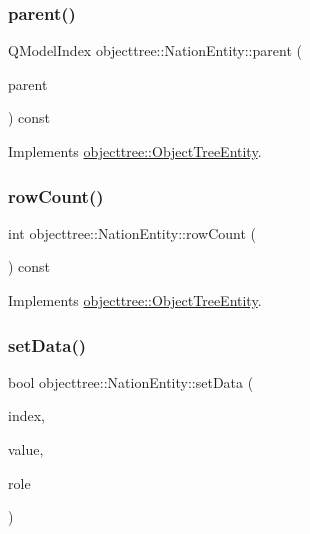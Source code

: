 \mbox{\label{classobjecttree_1_1_nation_entity_a8d234e253f9fee34e9914f211ca07345}} 
\subsubsection{\texorpdfstring{parent()}{parent()}}
{\footnotesize\ttfamily Q\+Model\+Index objecttree\+::\+Nation\+Entity\+::parent (\begin{DoxyParamCaption}\item[{const Q\+Model\+Index \&}]{parent }\end{DoxyParamCaption}) const\hspace{0.3cm}{\ttfamily [virtual]}}



Implements \mbox{\hyperlink{classobjecttree_1_1_object_tree_entity_a2d1b13c056476f87637aacd7e99e7305}{objecttree\+::\+Object\+Tree\+Entity}}.

\mbox{\label{classobjecttree_1_1_nation_entity_ad7eee2c49a533376829241e4477c8d9d}} 
\subsubsection{\texorpdfstring{rowCount()}{rowCount()}}
{\footnotesize\ttfamily int objecttree\+::\+Nation\+Entity\+::row\+Count (\begin{DoxyParamCaption}{ }\end{DoxyParamCaption}) const\hspace{0.3cm}{\ttfamily [virtual]}}



Implements \mbox{\hyperlink{classobjecttree_1_1_object_tree_entity_a82c626bb28c55dcfce11cf7ec3368588}{objecttree\+::\+Object\+Tree\+Entity}}.

\mbox{\label{classobjecttree_1_1_nation_entity_a0021c25f09f403b8d9b1f3366f08d7f8}} 
\subsubsection{\texorpdfstring{setData()}{setData()}}
{\footnotesize\ttfamily bool objecttree\+::\+Nation\+Entity\+::set\+Data (\begin{DoxyParamCaption}\item[{const Q\+Model\+Index \&}]{index,  }\item[{const Q\+Variant \&}]{value,  }\item[{int}]{role }\end{DoxyParamCaption})\hspace{0.3cm}{\ttfamily [virtual]}}



